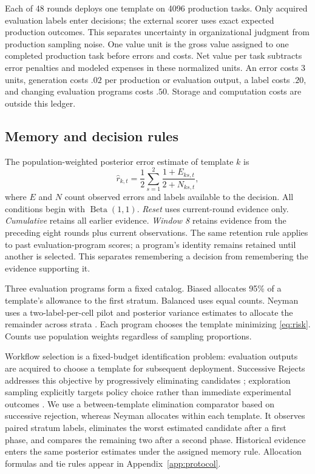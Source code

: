 Each of 48 rounds deploys one template on 4096 production tasks. Only acquired evaluation labels enter decisions; the external scorer uses exact expected production outcomes. This separates uncertainty in organizational judgment from production sampling noise. One value unit is the gross value assigned to one completed production task before errors and costs. Net value per task subtracts error penalties and modeled expenses in these normalized units. An error costs 3 units, generation costs $.02$ per production or evaluation output, a label costs $.20$, and changing evaluation programs costs $.50$. Storage and computation costs are outside this ledger.

\subsection{Memory and decision rules}
The population-weighted posterior error estimate of template $k$ is
\begin{equation}
\widehat r_{k,t}=\frac12\sum_{s=1}^{2}\frac{1+E_{ks,t}}{2+N_{ks,t}},
\label{eq:risk}
\end{equation}
where $E$ and $N$ count observed errors and labels available to the decision. All conditions begin with $\operatorname{Beta}(1,1)$. \emph{Reset} uses current-round evidence only. \emph{Cumulative} retains all earlier evidence. \emph{Window 8} retains evidence from the preceding eight rounds plus current observations. The same retention rule applies to past evaluation-program scores; a program's identity remains retained until another is selected. This separates remembering a decision from remembering the evidence supporting it.

Three evaluation programs form a fixed catalog. Biased allocates 95\% of a template's allowance to the first stratum. Balanced uses equal counts. Neyman uses a two-label-per-cell pilot and posterior variance estimates to allocate the remainder across strata \citep{neyman}. Each program chooses the template minimizing \cref{eq:risk}. Counts use population weights regardless of sampling proportions.

Workflow selection is a fixed-budget identification problem: evaluation outputs are acquired to choose a template for subsequent deployment. Successive Rejects addresses this objective by progressively eliminating candidates \citep{bai}; exploration sampling explicitly targets policy choice rather than immediate experimental outcomes \citep{kasy}. We use a between-template elimination comparator based on successive rejection, whereas Neyman allocates within each template. It observes paired stratum labels, eliminates the worst estimated candidate after a first phase, and compares the remaining two after a second phase. Historical evidence enters the same posterior estimates under the assigned memory rule. Allocation formulas and tie rules appear in Appendix~\ref{app:protocol}.

